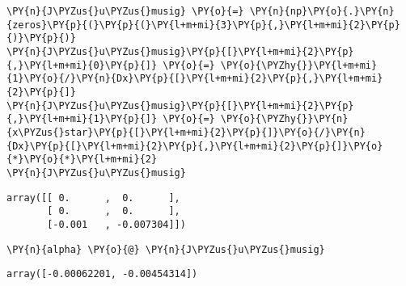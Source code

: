     \begin{tcolorbox}[breakable, size=fbox, boxrule=1pt, pad at break*=1mm,colback=cellbackground, colframe=cellborder]
\begin{Verbatim}[commandchars=\\\{\}]
\PY{n}{J\PYZus{}u\PYZus{}musig} \PY{o}{=} \PY{n}{np}\PY{o}{.}\PY{n}{zeros}\PY{p}{(}\PY{p}{(}\PY{l+m+mi}{3}\PY{p}{,}\PY{l+m+mi}{2}\PY{p}{)}\PY{p}{)}
\PY{n}{J\PYZus{}u\PYZus{}musig}\PY{p}{[}\PY{l+m+mi}{2}\PY{p}{,}\PY{l+m+mi}{0}\PY{p}{]} \PY{o}{=} \PY{o}{\PYZhy{}}\PY{l+m+mi}{1}\PY{o}{/}\PY{n}{Dx}\PY{p}{[}\PY{l+m+mi}{2}\PY{p}{,}\PY{l+m+mi}{2}\PY{p}{]}
\PY{n}{J\PYZus{}u\PYZus{}musig}\PY{p}{[}\PY{l+m+mi}{2}\PY{p}{,}\PY{l+m+mi}{1}\PY{p}{]} \PY{o}{=} \PY{o}{\PYZhy{}}\PY{n}{x\PYZus{}star}\PY{p}{[}\PY{l+m+mi}{2}\PY{p}{]}\PY{o}{/}\PY{n}{Dx}\PY{p}{[}\PY{l+m+mi}{2}\PY{p}{,}\PY{l+m+mi}{2}\PY{p}{]}\PY{o}{*}\PY{o}{*}\PY{l+m+mi}{2}
\PY{n}{J\PYZus{}u\PYZus{}musig}
\end{Verbatim}
\end{tcolorbox}

            \begin{tcolorbox}[breakable, size=fbox, boxrule=.5pt, pad at break*=1mm, opacityfill=0]
\begin{Verbatim}[commandchars=\\\{\}]
array([[ 0.      ,  0.      ],
       [ 0.      ,  0.      ],
       [-0.001   , -0.007304]])
\end{Verbatim}
\end{tcolorbox}
        
    \begin{tcolorbox}[breakable, size=fbox, boxrule=1pt, pad at break*=1mm,colback=cellbackground, colframe=cellborder]
\begin{Verbatim}[commandchars=\\\{\}]
\PY{n}{alpha} \PY{o}{@} \PY{n}{J\PYZus{}u\PYZus{}musig}
\end{Verbatim}
\end{tcolorbox}

            \begin{tcolorbox}[breakable, size=fbox, boxrule=.5pt, pad at break*=1mm, opacityfill=0]
\begin{Verbatim}[commandchars=\\\{\}]
array([-0.00062201, -0.00454314])
\end{Verbatim}
\end{tcolorbox}
        
